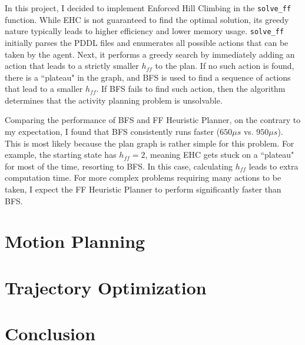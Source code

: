 \documentclass{article}
\begin{document}
In this project, I decided to implement Enforced Hill Climbing in the \texttt{solve\_ff} function. While EHC is not guaranteed to find the optimal solution, its greedy nature typically leads to higher efficiency and lower memory usage. \texttt{solve\_ff} initially parses the PDDL files and enumerates all possible actions that can be taken by the agent. Next, it performs a greedy search by immediately adding an action that leads to a strictly smaller $h_{ff}$ to the plan. If no such action is found, there is a ``plateau" in the graph, and BFS is used to find a sequence of actions that lead to a smaller $h_{ff}$. If BFS fails to find such action, then the algorithm determines that the activity planning problem is unsolvable.

Comparing the performance of BFS and FF Heuristic Planner, on the contrary to my expectation, I found that BFS consistently runs faster ($650\mu s$ vs. $950\mu s$). This is most likely because the plan graph is rather simple for this problem. For example, the starting state has $h_{ff}=2$, meaning EHC gets stuck on a ``plateau" for most of the time, resorting to BFS. In this case, calculating $h_{ff}$ leads to extra computation time. For more complex problems requiring many actions to be taken, I expect the FF Heuristic Planner to perform significantly faster than BFS.

\section{Motion Planning}

\section{Trajectory Optimization}

\cite{Cui1}

\section{Conclusion}

\printbibliography
\end{document}
